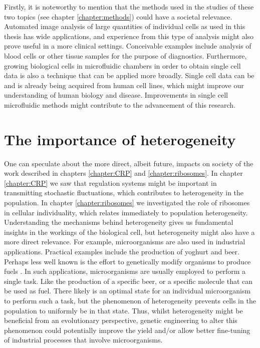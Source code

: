 %
%
Firstly, 
it is noteworthy to mention that the methods used in the studies of these two topics (see chapter \ref{chapter:methods})
could have a societal relevance. 
%
Automated image analysis of large quantities of individual cells as used in this thesis has wide applications, %
and experience from this type of analysis might also prove useful in a more clinical settings.
%
Conceivable examples include analysis of blood cells or other tissue samples for the purpose of diagnostics.
%
Furthermore, growing biological cells in microfluidic chambers in order to obtain single cell data is also a technique that can be applied more broadly.
%
Single cell data can be and is already being acquired from human cell lines, 
which might improve our understanding of human biology and disease.
%
Improvements in single cell microfluidic methods might contribute to the advancement of this research.

\section{The importance of heterogeneity}

One can speculate about the more direct, albeit future, impacts on society of 
the work described in chapters \ref{chapter:CRP} and \ref{chapter:ribosomes}.
%
%
In chapter \ref{chapter:CRP} we saw that regulation systems might be important in transmitting stochastic fluctuations, 
which contributes to heterogeneity in the population.
%
In chapter \ref{chapter:ribosomes} we investigated the role of ribosomes in cellular individuality, which relates immediately to population heterogeneity.
%
Understanding the mechanisms behind heterogeneity gives us fundamental insights in the workings of the biological cell, 
but heterogeneity might also have a more direct relevance.
%
For example, microorganisms are also used in industrial applications.
%
Practical examples include the production of yoghurt and beer.
Perhaps less well known is the effort to 
genetically modify organisms to produce fuels \cite{Lee2008, Savakis2013}. 
%
In such applications, microorganisms are usually employed to perform a single task.
%
Like the production of a specific beer, or a specific molecule that can be used as fuel. 
%
There likely is an optimal state for an individual microorganism to perform such a task, 
but the phenomenon of heterogeneity prevents cells in the population to uniformly be in that state.
%
%
Thus, whilst heterogeneity might be beneficial from an evolutionary perspective,
genetic engineering to alter this phenomenon could potentially improve the yield and/or allow better fine-tuning of industrial processes that involve microorganisms.

